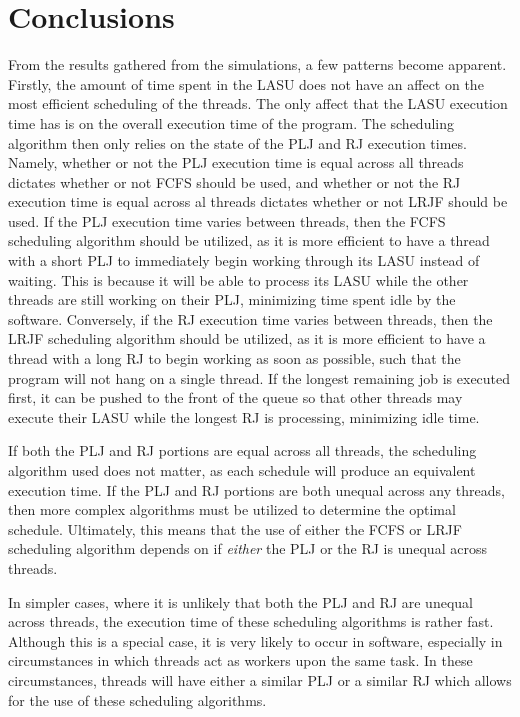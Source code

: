 \documentclass[letterpaper,12pt]{article}
\begin{document}
\section{Conclusions}
From the results gathered from the simulations, a few patterns become apparent.
Firstly, the amount of time spent in the LASU does not have an affect on the most efficient scheduling of the threads.
The only affect that the LASU execution time has is on the overall execution time of the program.
The scheduling algorithm then only relies on the state of the PLJ and RJ execution times.
Namely, whether or not the PLJ execution time is equal across all threads dictates whether or not FCFS should be used, and whether or not the RJ execution time is equal across al threads dictates whether or not LRJF should be used.
If the PLJ execution time varies between threads, then the FCFS scheduling algorithm should be utilized, as it is more efficient to have a thread with a short PLJ to immediately begin working through its LASU instead of waiting.
This is because it will be able to process its LASU while the other threads are still working on their PLJ, minimizing time spent idle by the software.
Conversely, if the RJ execution time varies between threads, then the LRJF scheduling algorithm should be utilized, as it is more efficient to have a thread with a long RJ to begin working as soon as possible, such that the program will not hang on a single thread.
If the longest remaining job is executed first, it can be pushed to the front of the queue so that other threads may execute their LASU while the longest RJ is processing, minimizing idle time.

If both the PLJ and RJ portions are equal across all threads, the scheduling algorithm used does not matter, as each schedule will produce an equivalent execution time.
If the PLJ and RJ portions are both unequal across any threads, then more complex algorithms must be utilized to determine the optimal schedule.
Ultimately, this means that the use of either the FCFS or LRJF scheduling algorithm depends on if \textit{either} the PLJ or the RJ is unequal across threads.

In simpler cases, where it is unlikely that both the PLJ and RJ are unequal across threads, the execution time of these scheduling algorithms is rather fast.
Although this is a special case, it is very likely to occur in software, especially in circumstances in which threads act as workers upon the same task.
In these circumstances, threads will have either a similar PLJ or a similar RJ which allows for the use of these scheduling algorithms.
\end{document}
